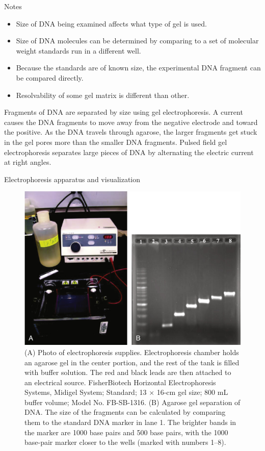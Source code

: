 \documentclass[
  ignorenonframetext,
  aspectratio=169]{beamer}
\providecommand{\tightlist}{%
  \setlength{\itemsep}{0pt}\setlength{\parskip}{0pt}}
\begin{document}
\begin{frame}{Notes}
\protect\hypertarget{notes}{}
\begin{itemize}
\tightlist
\item
  Size of DNA being examined affects what type of gel is used.
\item
  Size of DNA molecules can be determined by comparing to a set of
  molecular weight standards run in a different well.
\item
  Because the standards are of known size, the experimental DNA fragment
  can be compared directly.
\item
  Resolvability of some gel matrix is different than other.
\end{itemize}

\begin{block}{}
\textrm{Fragments of DNA are separated by size using gel electrophoresis. A current causes the DNA fragments to move away from the negative electrode and toward the positive. As the DNA travels through agarose, the larger fragments get stuck in the gel pores more than the smaller DNA fragments. Pulsed field gel electrophoresis separates large pieces of DNA by alternating the electric current at right angles.}
\end{block}
\end{frame}

\begin{frame}{Electrophoresis apparatus and visualization}
\protect\hypertarget{electrophoresis-apparatus-and-visualization}{}
\begin{figure}
\includegraphics[width=0.45\linewidth]{./../images/electrophoresis} \caption{(A) Photo of electrophoresis supplies. Electrophoresis chamber holds an agarose gel in the center portion, and the rest of the tank is filled with buffer solution. The red and black leads are then attached to an electrical source. FisherBiotech Horizontal Electrophoresis Systems, Midigel System; Standard; 13 $\times$ 16-cm gel size; 800 mL buffer volume; Model No. FB-SB-1316. (B) Agarose gel separation of DNA. The size of the fragments can be calculated by comparing them to the standard DNA marker in lane 1. The brighter bands in the marker are 1000 base pairs and 500 base pairs, with the 1000 base-pair marker closer to the wells (marked with numbers 1–8).}\label{fig:gel-electrophoresis}
\end{figure}
\end{frame}
\end{document}
